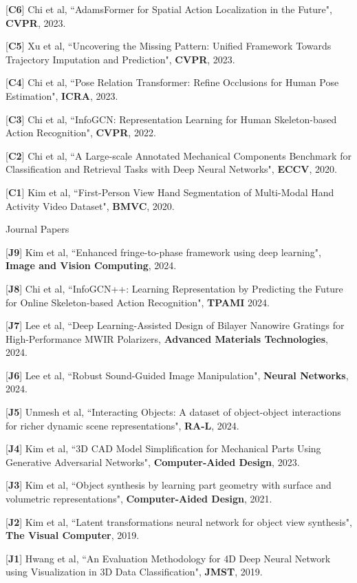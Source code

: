 \begin{cventries}
{\begin{cvitems}
    \item {[\textbf{C6}] Chi et al, ``AdamsFormer for Spatial Action Localization in the Future", \textbf{CVPR}, 2023.}
    \item {[\textbf{C5}] Xu et al, ``Uncovering the Missing Pattern: Unified Framework Towards Trajectory Imputation and Prediction", \textbf{CVPR}, 2023.}
    \item {[\textbf{C4}] Chi et al, ``Pose Relation Transformer: Refine Occlusions for Human Pose Estimation", \textbf{ICRA}, 2023.}
    \item {[\textbf{C3}] Chi et al, ``InfoGCN: Representation Learning for Human Skeleton-based Action Recognition", \textbf{CVPR}, 2022.}
    \item {[\textbf{C2}] Chi et al, ``A Large-scale Annotated Mechanical Components Benchmark for Classification and Retrieval Tasks with Deep Neural Networks", \textbf{ECCV}, 2020.}
    \item {[\textbf{C1}] Kim et al, ``First-Person View Hand Segmentation of Multi-Modal Hand Activity Video Dataset", \textbf{BMVC}, 2020.}
\end{cvitems}
}


\vspace{-.5em}
\cvpub
{Journal Papers} %
{ %
\begin{cvitems}
    \item {[\textbf{J9}] Kim et al, ``Enhanced fringe-to-phase framework using deep learning", \textbf{Image and Vision Computing}, 2024.}
    \item {[\textbf{J8}] Chi et al, ``InfoGCN++: Learning Representation by Predicting the Future for Online Skeleton-based Action Recognition", \textbf{TPAMI} 2024. }
    \item {[\textbf{J7}] Lee et al, ``Deep Learning-Assisted Design of Bilayer Nanowire Gratings for High-Performance MWIR Polarizers, \textbf{Advanced Materials Technologies}, 2024. }
    \item {[\textbf{J6}] Lee et al, ``Robust Sound-Guided Image Manipulation", \textbf{Neural Networks}, 2024.}
    \item {[\textbf{J5}] Unmesh et al, ``Interacting Objects: A dataset of object-object interactions for richer dynamic scene representations", \textbf{RA-L}, 2024.}
    \item {[\textbf{J4}] Kim et al, ``3D CAD Model Simplification for Mechanical Parts Using Generative Adversarial Networks", \textbf{Computer-Aided Design}, 2023.}
    \item {[\textbf{J3}] Kim et al, ``Object synthesis by learning part geometry with surface and volumetric representations", \textbf{Computer-Aided Design}, 2021.}
    \item {[\textbf{J2}] Kim et al, ``Latent transformations neural network for object view synthesis", \textbf{The Visual Computer}, 2019.}
    \item {[\textbf{J1}] Hwang et al, ``An Evaluation Methodology for 4D Deep Neural Network using Visualization in 3D Data Classification", \textbf{JMST}, 2019.}
\end{cvitems}
}


\end{cventries}
